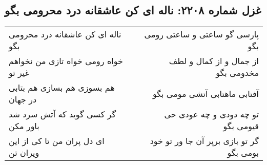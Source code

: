 \begin{center}
\section*{غزل شماره ۲۲۰۸: ناله ای کن عاشقانه درد محرومی بگو}
\label{sec:2208}
\begin{longtable}{l p{0.5cm} r}
ناله ای کن عاشقانه درد محرومی بگو
&&
پارسی گو ساعتی و ساعتی رومی بگو
\\
خواه رومی خواه تازی من نخواهم غیر تو
&&
از جمال و از کمال و لطف مخدومی بگو
\\
هم بسوزی هم بسازی هم بتابی در جهان
&&
آفتابی ماهتابی آتشی مومی بگو
\\
گر کسی گوید که آتش سرد شد باور مکن
&&
تو چه دودی و چه عودی حی قیومی بگو
\\
ای دل پران من تا کی از این ویران تن
&&
گر تو بازی برپر آن جا ور تو خود بومی بگو
\\
\end{longtable}
\end{center}
